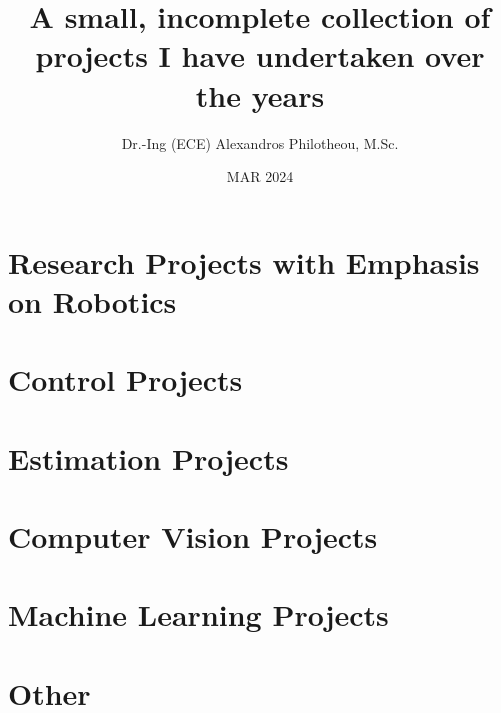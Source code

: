 






  \title{\Huge A small, incomplete collection of projects I have undertaken over the years}
  \author{Dr.-Ing (ECE) Alexandros Philotheou, M.Sc. }
  \date{MAR 2024}
  \maketitle
  \vspace{2cm}

  \tableofcontents
  \thispagestyle{empty}
  \cleardoublepage

  \section{Research Projects with Emphasis on Robotics}
    
    \newpage
    
    \newpage

  \section{Control Projects}
    
    \newpage
    
    \newpage
    
    \newpage
    
    \newpage

  \section{Estimation Projects}
    
    \newpage

  \section{Computer Vision Projects}
    
    \newpage

  \section{Machine Learning Projects}
    
    \newpage

  \section{Other}
    

  \printbibliography[notcategory=nobibliography]


